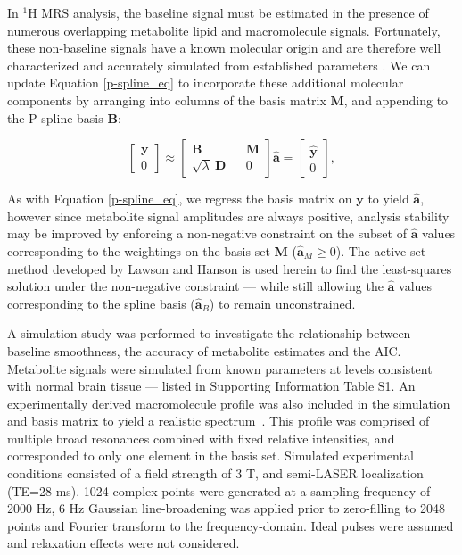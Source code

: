 \documentclass[num-refs]{wiley-article}
\begin{document}
In $^1\mathrm{H}$ MRS analysis, the baseline signal must be estimated in the presence of numerous overlapping metabolite lipid and macromolecule signals. Fortunately, these non-baseline signals have a known molecular origin and are therefore well characterized and accurately simulated from established parameters \cite{Govind2015}. We can update Equation \ref{p-spline_eq} to incorporate these additional molecular components by arranging into columns of the basis matrix $\mathbf{M}$, and appending to the P-spline basis $\mathbf{B}$:

\begin{equation}
  \begin{bmatrix}
    \textbf{y} \\ 0
  \end{bmatrix}
  \approx
  \begin{bmatrix}
    \textbf{B} && \textbf{M} \\ \sqrt{\lambda} \ \textbf{D} && 0
  \end{bmatrix} \hat{\mathbf{a}} =
  \begin{bmatrix}
    \hat{\textbf{y}} \\ 0
  \end{bmatrix},
  \label{mrs_bl}
\end{equation}

As with Equation \ref{p-spline_eq}, we regress the basis matrix on $\mathbf{y}$ to yield $\hat{\mathbf{a}}$, however since metabolite signal amplitudes are always positive, analysis stability may be improved by enforcing a non-negative constraint on the subset of $\hat{\mathbf{a}}$ values corresponding to the weightings on the basis set $\textbf{M}$ ($\hat{\mathbf{a}}_{M} \geq 0$). The active-set method developed by Lawson and Hanson \cite{Lawson1995} is used herein to find the least-squares solution under the non-negative constraint --- while still allowing the $\hat{\mathbf{a}}$ values corresponding to the spline basis ($\hat{\mathbf{a}}_{B}$) to remain unconstrained.

A simulation study was performed to investigate the relationship between baseline smoothness, the accuracy of metabolite estimates and the AIC. Metabolite signals were simulated from known parameters \cite{Govind2015} at levels consistent with normal brain tissue \cite{deGraaf2018} --- listed in Supporting Information Table S1. An experimentally derived macromolecule profile was also included in the simulation and basis matrix to yield a realistic spectrum~\cite{Birch2017}. This profile was comprised of multiple broad resonances combined with fixed relative intensities, and corresponded to only one element in the basis set. Simulated experimental conditions consisted of a field strength of 3 T, and semi-LASER localization (TE=28 ms). 1024 complex points were generated at a sampling frequency of 2000 Hz, 6 Hz Gaussian line-broadening was applied prior to zero-filling to 2048 points and Fourier transform to the frequency-domain. Ideal pulses were assumed and relaxation effects were not considered.
\end{document}
